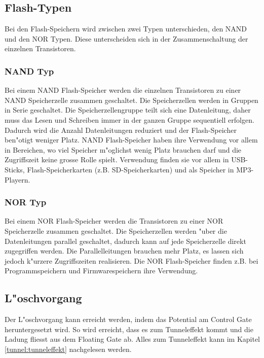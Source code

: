 \begin{refsection}
\subsection{Flash-Typen}
Bei den Flash-Speichern wird zwischen zwei Typen unterschieden, den NAND
und den NOR Typen.
Diese unterscheiden sich in der Zusammenschaltung der einzelnen Transistoren.

\subsubsection{NAND Typ}
Bei einem NAND Flash-Speicher werden die einzelnen Transistoren zu einer
NAND Speicherzelle zusammen geschaltet.
Die Speicherzellen werden in Gruppen in Serie geschaltet.
Die Speicherzellengruppe teilt sich eine Datenleitung, daher muss das
Lesen und Schreiben immer in der ganzen Gruppe sequentiell erfolgen.
Dadurch wird die Anzahl Datenleitungen reduziert und der Flash-Speicher
ben"otigt weniger Platz.
NAND Flash-Speicher haben ihre Verwendung vor allem in Bereichen, wo viel
Speicher m"oglichst wenig Platz brauchen darf und die Zugriffszeit keine
grosse Rolle spielt.
Verwendung finden sie vor allem in USB-Sticks, Flash-Speicherkarten
(z.B. SD-Speicherkarten) und als Speicher in MP3-Playern.

\subsubsection{NOR Typ}
Bei einem NOR Flash-Speicher werden die Transistoren zu einer NOR
Speicherzelle zusammen geschaltet.
Die Speicherzellen werden "uber die Datenleitungen parallel geschaltet,
dadurch kann auf jede Speicherzelle direkt zugegriffen werden.
Die Parallelleitungen brauchen mehr Platz, es lassen sich jedoch k"urzere
Zugriffszeiten realisieren.
Die NOR Flash-Speicher finden z.B. bei Programmspeichern und Firmwarespeichern
ihre Verwendung.

\subsection{L"oschvorgang}
Der L"oschvorgang kann erreicht werden, indem das Potential am 
Control Gate heruntergesetzt wird.
So wird erreicht, dass es zum Tunneleffekt kommt und die Ladung fliesst
aus dem Floating Gate ab.
Alles zum Tunneleffekt kann im Kapitel \ref{tunnel:tunneleffekt} nachgelesen werden.


\end{refsection}
